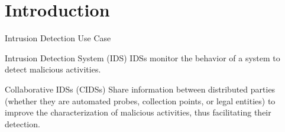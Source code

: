 \section*{Introduction}

\begin{frame}{Intrusion Detection Use Case}

    \begin{block}{Intrusion Detection System (IDS)}
        IDSs monitor the behavior of a system to detect malicious activities.
    \end{block}
    \hfill
    \pause
    \begin{block}{Collaborative IDSs (CIDSs)}
        Share information between \alert<3>{distributed parties} (whether they are automated probes, collection points, or legal entities) to improve the characterization of malicious activities, thus facilitating their detection.
    \end{block}

\end{frame}



